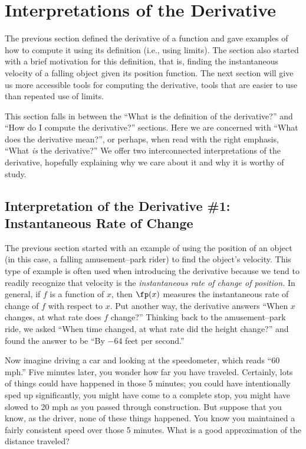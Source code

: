 \section{Interpretations of the Derivative}\label{sec:interp_deriv}

The previous section defined the derivative of a function and gave examples of how to compute it using its definition (i.e., using limits). The section also started with a brief motivation for this definition, that is, finding the instantaneous velocity of a falling object given its position function. The next section will give us more accessible tools for computing the derivative, tools that are easier to use than repeated use of limits.

This section falls in between the ``What is the definition of the derivative?'' and ``How do I compute the derivative?'' sections. Here we are concerned with ``What does the derivative mean?'', or perhaps, when read with the right emphasis, ``What \textit{is} the derivative?'' We offer two interconnected interpretations of the derivative, hopefully explaining why we care about it and why it is worthy of study.

\subsection{Interpretation of the Derivative \#1: Instantaneous Rate of Change}

The previous section started with an example of using the position of an object (in this case, a falling amusement--park rider) to find the object's velocity. This type of example is often used when introducing the derivative because we tend to readily recognize that velocity is the \textit{instantaneous rate of change of position.} In general, if $f$ is a function of $x$, then $\fp(x)$ measures the instantaneous rate of change of $f$ with respect to $x$. Put another way, the derivative answers ``When $x$ changes, at what rate does $f$ change?'' Thinking back to the amusement--park ride, we asked ``When time changed, at what rate did the height change?'' and found the answer to be ``By $-64$ feet per second.'' 

Now imagine driving a car and looking at the speedometer, which reads ``60 mph.'' Five minutes later, you wonder how far you have traveled. Certainly, lots of things could have happened in those 5 minutes; you could have intentionally sped up significantly, you might have come to a complete stop, you might have slowed to 20 mph as you passed through construction.  But suppose that you know, as the driver, none of these things happened. You know you maintained a fairly consistent speed over those 5 minutes. What is a good approximation of the distance traveled?

